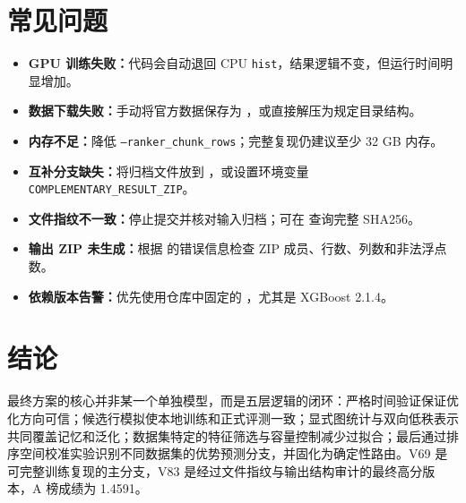\documentclass[UTF8,a4paper,11pt]{ctexart}
\begin{document}
\section{常见问题}

\begin{itemize}
  \item \textbf{GPU 训练失败：}代码会自动退回 CPU \texttt{hist}，结果逻辑不变，但运行时间明显增加。
  \item \textbf{数据下载失败：}手动将官方数据保存为 ，或直接解压为规定目录结构。
  \item \textbf{内存不足：}降低 \texttt{--ranker\_chunk\_rows}；完整复现仍建议至少 32 GB 内存。
  \item \textbf{互补分支缺失：}将归档文件放到 ，或设置环境变量 \texttt{COMPLEMENTARY\_RESULT\_ZIP}。
  \item \textbf{文件指纹不一致：}停止提交并核对输入归档；可在  查询完整 SHA256。
  \item \textbf{输出 ZIP 未生成：}根据  的错误信息检查 ZIP 成员、行数、列数和非法浮点数。
  \item \textbf{依赖版本告警：}优先使用仓库中固定的 ，尤其是 XGBoost 2.1.4。
\end{itemize}

\section{结论}

最终方案的核心并非某一个单独模型，而是五层逻辑的闭环：严格时间验证保证优化方向可信；候选行模拟使本地训练和正式评测一致；显式图统计与双向低秩表示共同覆盖记忆和泛化；数据集特定的特征筛选与容量控制减少过拟合；最后通过排序空间校准实验识别不同数据集的优势预测分支，并固化为确定性路由。V69 是可完整训练复现的主分支，V83 是经过文件指纹与输出结构审计的最终高分版本，A 榜成绩为 1.4591。
\end{document}
